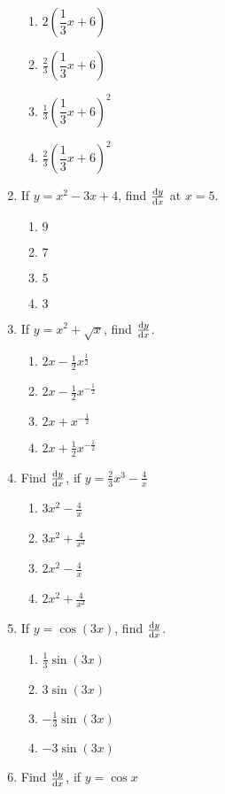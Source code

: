 \begin{multicols}{2}
\begin{enumerate}[label={\arabic*.}]
	\begin{enumerate}[label={\Alph*.}]
	\item \(2{\left(\dfrac{1}{3}x + 6\right)}\)
	\item \(\frac{2}{3}{\left(\dfrac{1}{3}x + 6\right)}\)
	\item \(\frac{1}{3}{\left(\dfrac{1}{3}x + 6\right)}^{2}\)
	\item \(\frac{2}{3}{\left(\dfrac{1}{3}x + 6\right)}^{2}\)
	\end{enumerate}
\item If \(y = {x}^{2}-3{x}+4\), find \(\dv{y}{x}\) at \(x = 5\).
	\begin{enumerate}[label={\Alph*.}]
	\item \(9\)
	\item \(7\)
	\item \(5\)
	\item \(3\)
	\end{enumerate}
\item If  \(y = {x}^{2}+\sqrt{x}\), find \(\dv{y}{x}\).
	\begin{enumerate}[label={\Alph*.}]
	\item \(2x-\frac{1}{2}x^{\frac{1}{2}}\)
	\item \(2x-\frac{1}{2}x^{-{\frac{1}{2}}}\)
	\item \(2x+x^{-{\frac{1}{2}}}\)
	\item \(2x+\frac{1}{2}x^{-{\frac{1}{2}}}\)
	\end{enumerate}
\item Find \(\dv{y}{x}\), if \(y = \frac{2}{3}{x}^{3}-\frac{4}{x}\)
	\begin{enumerate}[label={\Alph*.}]
	\item \({3}{x}^{2}-\frac{4}{x}\)
	\item \({3}{x}^{2}+\frac{4}{x^{2}}\)
	\item \({2}{x}^{2}-\frac{4}{x}\)
	\item \({2}{x}^{2}+\frac{4}{x^{2}}\)
	\end{enumerate}
\item If \(y = \cos{(3x)}\), find \(\dv{y}{x}\).
	\begin{enumerate}[label={\Alph*.}]
	\item \(\frac{1}{3}\sin{(3x)}\)
	\item \({3}\sin{(3x)}\)
	\item \(-{\frac{1}{3}}\sin{(3x)}\)
	\item \(-3\sin{(3x)}\)
	\end{enumerate}
\item Find \(\dv{y}{x}\), if \(y = \cos{x}\)

\end{enumerate}
\end{multicols}

